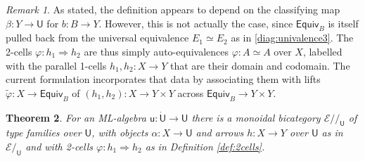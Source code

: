 \documentclass[12pt,reqno]{amsart}
\newcommand{\EE}{\ensuremath{\mathcal{E}}}
\renewcommand{\to}{\ensuremath{\rightarrow}}
\renewcommand{\t}{\ensuremath{\mathsf{u}}}
\newcommand{\T}{\ensuremath{\mathsf{U}}}
\newcommand{\TT}{\ensuremath{\dot{\mathsf{U}}}}
\newtheorem{theorem}{Theorem}
\newtheorem{lemma}[theorem]{Lemma}
\theoremstyle{remark}
\newtheorem{remark}[theorem]{Remark}
\theoremstyle{definition}
\begin{document}
\begin{remark}\label{2cellsareglobal}
As stated, the definition appears to depend on the classifying map $\beta : Y\to \T$ for $b:B\to Y$. However,  this is not actually the case,
since $\mathsf{Equiv}_B$ is itself pulled back from the universal equivalence $E_1\simeq E_2$ as in \eqref{diag:univalence3}.  The 2-cells $\varphi : h_1 \Rightarrow h_2$ are thus simply auto-equivalences $\varphi: A \simeq A$ over $X$, labelled with the parallel 1-cells $h_1, h_2 : X \to Y$ that are their domain and codomain. The current formulation incorporates that data by associating them with lifts $\tilde{\varphi} : X \to \mathsf{Equiv}_B$ of $(h_1, h_2) : X \to Y \times Y$ across $\mathsf{Equiv}_B \to Y\times Y$. 
\end{remark}

%
% 
 
\begin{theorem}\label{thm:MLAlgbicat}
For an ML-algebra $\t : \TT \to \T$ there is a monoidal bicategory $\EE/\!/_\T$ of type families over $\T$, with objects $\alpha : X\to \T$ and arrows $h : X \to Y$ over $\T$ as in $\EE/_\T$ and with 2-cells $\varphi : h_1 \Rightarrow h_2$ as in Definition \ref{def:2cells}.  
\end{theorem}
\end{document}

